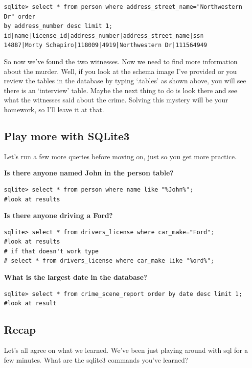 \documentclass[12pt,a4paper]{article}
\begin{document}
\begin{lstlisting}[style=term]
sqlite> select * from person where address_street_name="Northwestern Dr" order
by address_number desc limit 1;
id|name|license_id|address_number|address_street_name|ssn
14887|Morty Schapiro|118009|4919|Northwestern Dr|111564949
\end{lstlisting}

So now we've found the two witnesses. Now we need to find more information about
the murder. Well, if you look at the schema image I've provided or you review
the tables in the database by typing `.tables' as shown above, you will see
there is an `interview' table. Maybe the next thing to do is look there and see
what the witnesses said about the crime. Solving this mystery will be your
homework, so I'll leave it at that.

\subsection{Play more with SQLite3}
Let's run a few more queries before moving on, just so you get more practice.

\textbf{Is there anyone named John in the person table?}

\begin{lstlisting}[style=term]
sqlite> select * from person where name like "%John%";
#look at results
\end{lstlisting}

\textbf{Is there anyone driving a Ford?}
\begin{lstlisting}[style=term]
sqlite> select * from drivers_license where car_make="Ford";
#look at results
# if that doesn't work type
# select * from drivers_license where car_make like "%ord%";
\end{lstlisting}

\textbf{What is the largest date in the database?}
\begin{lstlisting}[style=term]
sqlite> select * from crime_scene_report order by date desc limit 1;
#look at result
\end{lstlisting}

\subsection{Recap}
Let's all agree on what we learned. We've been just playing around with sql for
a few minutes. What are the sqlite3 commands you've learned?
\end{document}
